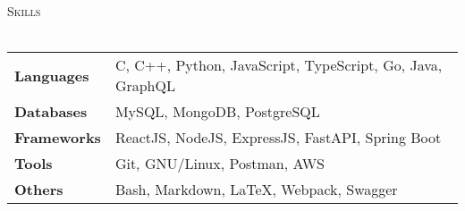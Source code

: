\documentclass[a4paper]{article}
\newcommand{\sectionSep} { \vspace{3mm} }
\newcommand{\lineunder} {
    \vspace*{-8pt} \\
    \hspace*{-15pt} \hrulefill \\
}
\newcommand{\header} [1] {
    {\hspace*{-18pt}\vspace*{6pt} {
        \fontfamily{qcs}\selectfont \large \scshape #1
    }}
    \vspace*{-6pt} \lineunder
    \vspace{1.1mm}
}
\newcommand{\volunteerItem}[5]{
    \textbf{#1} -- \textit{#2} \hfill #3 \\
    \begin{itemize}
        #4
    \end{itemize}
}
\begin{document}


\sectionSep

\header{Skills}
\begin{tabularx}{\textwidth}{X l}
    \textbf{Languages}  & C, C++, Python, JavaScript, TypeScript, Go, Java, GraphQL \\
    \textbf{Databases}  & MySQL, MongoDB, PostgreSQL                                \\
    \textbf{Frameworks} & ReactJS, NodeJS, ExpressJS, FastAPI, Spring Boot          \\
    \textbf{Tools}      & Git, GNU/Linux, Postman, AWS                              \\
    \textbf{Others}     & Bash, Markdown, LaTeX, Webpack, Swagger                   \\
\end{tabularx}
\end{document}
